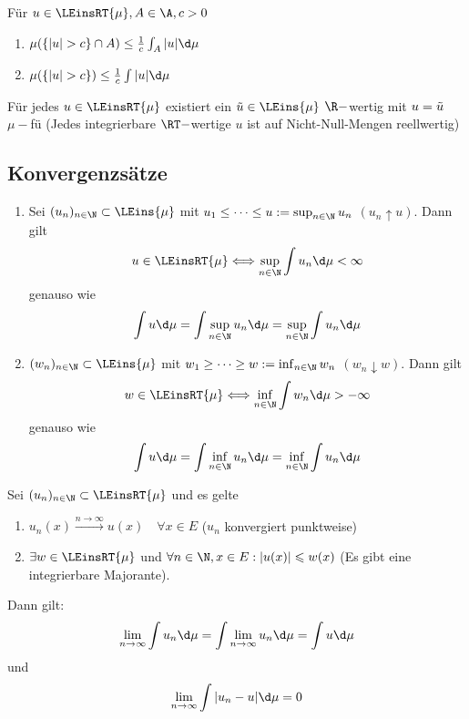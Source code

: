 \documentclass[11pt, a4paper]{article}
\begin{document}
\begin{corollary}
Für $u\in\LEinsRT{\mu}, A\in \A, c>0$
\begin{enumerate}
    \item $\mu(\{|u|>c\} \cap A) \leq \frac 1 c \int_A |u|\d\mu$
    \item $\mu(\{|u|>c\} ) \leq \frac 1 c \int |u|\d\mu$
\end{enumerate}
\end{corollary}

\begin{corollary}
    Für jedes $u\in \LEinsRT{\mu}$ existiert ein $\Tilde{u}\in \LEins{\mu}$ $\R-$wertig mit $u=\Tilde{u}$ $\mu-$fü (Jedes integrierbare $\RT-$wertige $u$ ist auf Nicht-Null-Mengen reellwertig)
\end{corollary}



 
\subsection{Konvergenzsätze}

\begin{theorem} 
\begin{enumerate}[label=\alph*)]
    \item Sei $(u_n)_{n\in\N} \subset \LEins{\mu}$ mit $u_1\leq \cdots \leq u:= \sup_{n\in \N} u_n$ $(u_n\uparrow u)$. Dann gilt
    $$u\in \LEinsRT{\mu} \Longleftrightarrow \sup_{n\in\N}\int u_n \d\mu < \infty $$
    genauso wie 
    $$\int u\d\mu = \int \sup_{n\in\N} u_n\d\mu =  \sup_{n\in\N}\int u_n\d\mu$$
    \item $(w_n)_{n\in\N} \subset \LEins{\mu}$ mit $w_1\geq \cdots \geq w:= \inf_{n\in \N} w_n$ $(w_n\downarrow w)$. Dann gilt
    $$w\in \LEinsRT{\mu} \Longleftrightarrow \inf_{n\in\N}\int w_n \d\mu >-\infty $$
    genauso wie 
    $$\int u\d\mu = \int \inf_{n\in\N} u_n\d\mu =  \inf_{n\in\N}\int u_n\d\mu$$
\end{enumerate}
\end{theorem}

\begin{theorem}
Sei $(u_n)_{n\in\N} \subset \LEinsRT{\mu}$ und es gelte 
\begin{enumerate}
    \item $u_n(x) \overset{n\to \infty}{\longrightarrow}u(x) \quad \forall x\in E$ ($u_n$ konvergiert punktweise)
    \item $\exists w\in \LEinsRT{\mu}$ und $\forall n\in \N, x\in E: |u(x)|\leqslant w(x)$ (Es gibt eine integrierbare Majorante).
\end{enumerate} 
Dann gilt:
$$\lim _{n\to \infty} \int u_n \d\mu = \int \lim_{n\to \infty} u_n\d\mu = \int u\d\mu$$
und $$\lim _{n\to \infty} \int |u_n-u| \d\mu = 0$$
\end{theorem}
\end{document}

